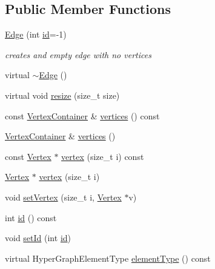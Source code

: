 \subsection*{Public Member Functions}
\begin{DoxyCompactItemize}
\item 
\mbox{\hyperlink{classg2o_1_1_hyper_graph_1_1_edge_a891618b34652837ef0bee7084db81f2e}{Edge}} (int \mbox{\hyperlink{classg2o_1_1_hyper_graph_1_1_edge_a93f47febcbd6c654fc3344d4643a087f}{id}}=-\/1)
\begin{DoxyCompactList}\small\item\em creates and empty edge with no vertices \end{DoxyCompactList}\item 
virtual \mbox{\hyperlink{classg2o_1_1_hyper_graph_1_1_edge_a202cb31558caef5a7bf18a49281173a3}{$\sim$\+Edge}} ()
\item 
virtual void \mbox{\hyperlink{classg2o_1_1_hyper_graph_1_1_edge_ad8913f1149a0fd5bb628f0f1c8a91a55}{resize}} (size\+\_\+t size)
\item 
const \mbox{\hyperlink{classg2o_1_1_hyper_graph_a9339534c99300a0ddac87ba976ef188c}{Vertex\+Container}} \& \mbox{\hyperlink{classg2o_1_1_hyper_graph_1_1_edge_aba1717ff01f972bd39ba992c0d9d9e04}{vertices}} () const
\item 
\mbox{\hyperlink{classg2o_1_1_hyper_graph_a9339534c99300a0ddac87ba976ef188c}{Vertex\+Container}} \& \mbox{\hyperlink{classg2o_1_1_hyper_graph_1_1_edge_a67d1c5cb557deab9e9e361c63359fe60}{vertices}} ()
\item 
const \mbox{\hyperlink{classg2o_1_1_hyper_graph_1_1_vertex}{Vertex}} $\ast$ \mbox{\hyperlink{classg2o_1_1_hyper_graph_1_1_edge_ab644c1c4e38a0112db1435fbc0233f25}{vertex}} (size\+\_\+t i) const
\item 
\mbox{\hyperlink{classg2o_1_1_hyper_graph_1_1_vertex}{Vertex}} $\ast$ \mbox{\hyperlink{classg2o_1_1_hyper_graph_1_1_edge_af544d5d17d900c5aa2b5c9219d8e716f}{vertex}} (size\+\_\+t i)
\item 
void \mbox{\hyperlink{classg2o_1_1_hyper_graph_1_1_edge_a5e957658d6e65c49b81197d052a7f16f}{set\+Vertex}} (size\+\_\+t i, \mbox{\hyperlink{classg2o_1_1_hyper_graph_1_1_vertex}{Vertex}} $\ast$v)
\item 
int \mbox{\hyperlink{classg2o_1_1_hyper_graph_1_1_edge_a93f47febcbd6c654fc3344d4643a087f}{id}} () const
\item 
void \mbox{\hyperlink{classg2o_1_1_hyper_graph_1_1_edge_a1270ed91efa5f7a0fc42229356cc23e1}{set\+Id}} (int \mbox{\hyperlink{classg2o_1_1_hyper_graph_1_1_edge_a93f47febcbd6c654fc3344d4643a087f}{id}})
\item 
virtual Hyper\+Graph\+Element\+Type \mbox{\hyperlink{classg2o_1_1_hyper_graph_1_1_edge_a04f1b4d408aebdf14ac3f0cfd247b776}{element\+Type}} () const
\end{DoxyCompactItemize}
